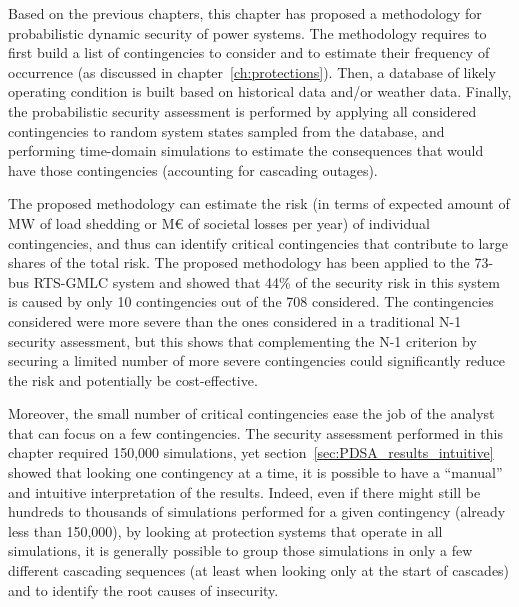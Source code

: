 Based on the previous chapters, this chapter has proposed a methodology for probabilistic dynamic security of power systems. The methodology requires to first build a list of contingencies to consider and to estimate their frequency of occurrence (as discussed in chapter~\ref{ch:protections}). Then, a database of likely operating condition is built based on historical data and/or weather data. Finally, the probabilistic security assessment is performed by applying all considered contingencies to random system states sampled from the database, and performing time-domain simulations to estimate the consequences that would have those contingencies (accounting for cascading outages).

The proposed methodology can estimate the risk (\eg in terms of expected amount of MW of load shedding or M€ of societal losses per year) of individual contingencies, and thus can identify critical contingencies that contribute to large shares of the total risk. The proposed methodology has been applied to the 73-bus RTS-GMLC system and showed that 44\% of the security risk in this system is caused by only 10 contingencies out of the 708 considered. The contingencies considered were more severe than the ones considered in a traditional N-1 security assessment, but this shows that complementing the N-1 criterion by securing a limited number of more severe contingencies could significantly reduce the risk and potentially be cost-effective.

Moreover, the small number of critical contingencies ease the job of the analyst that can focus on a few contingencies. The security assessment performed in this chapter required 150,000 simulations, yet section~\ref{sec:PDSA_results_intuitive} showed that looking one contingency at a time, it is possible to have a ``manual'' and intuitive interpretation of the results. Indeed, even if there might still be hundreds to thousands of simulations performed for a given contingency (already less than 150,000), by looking at protection systems that operate in all simulations, it is generally possible to group those simulations in only a few different cascading sequences (at least when looking only at the start of cascades) and to identify the root causes of insecurity.

